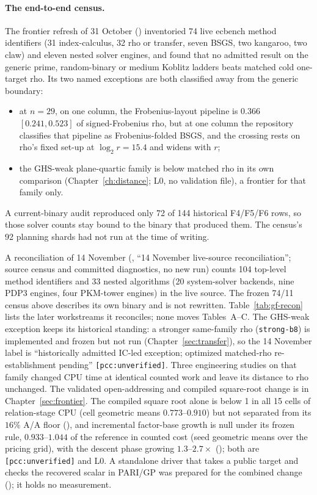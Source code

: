 \paragraph{The end-to-end census.} The frontier refresh of 31 October
() inventoried 74 live ecbench
method identifiers (31 index-calculus, 32 rho or transfer, seven BSGS, two
kangaroo, two claw) and eleven nested solver engines, and found that no
admitted result on the generic prime, random-binary or medium Koblitz
ladders beats matched cold one-target rho. Its two named exceptions are
both classified away from the generic boundary:
\begin{itemize}
\item at $n=29$, on one column, the Frobenius-layout pipeline is $0.366$
  $[0.241,0.523]$ of signed-Frobenius rho, but at one column the repository
  classifies that pipeline as Frobenius-folded BSGS, and the crossing rests
  on rho's fixed set-up at $\log_2r=15.4$ and widens with $r$;
\item the GHS-weak plane-quartic family is below matched rho in its own
  comparison (Chapter~\ref{ch:distance}; L0, no validation file), a
  frontier for that family only.
\end{itemize}
A current-binary audit reproduced only 72 of 144 historical F4/F5/F6 rows,
so those solver counts stay bound to the binary that produced them. The
census's 92 planning shards had not run at the time of writing.

A reconciliation of 14 November
(, ``14 November
live-source reconciliation''; source census and committed diagnostics, no new
run) counts 104 top-level method identifiers and 33 nested algorithms (20
system-solver backends, nine PDP3 engines, four PKM-tower engines) in the
live source. The frozen 74/11 census above describes its own binary and is
not rewritten. Table~\ref{tab:gf-recon} lists the later workstreams it
reconciles; none moves Tables~A--C. The GHS-weak exception keeps its
historical standing: a stronger same-family rho (\texttt{strong-b8}) is
implemented and frozen but not run (Chapter~\ref{sec:transfer}), so the
14 November label is ``historically admitted IC-led exception; optimized
matched-rho re-establishment pending'' \texttt{[pcc:unverified]}. Three
engineering studies on that family changed CPU time at identical counted
work and leave its distance to rho unchanged. The validated open-addressing
and compiled square-root change is in Chapter~\ref{sec:frontier}. The
compiled square root alone is below 1 in all 15 cells of relation-stage CPU
(cell geometric means $0.773$--$0.910$) but not separated from its $16\%$
A/A floor (), and
incremental factor-base growth is null under its frozen rule, $0.933$--$1.044$
of the reference in counted cost (seed geometric means over the pricing
grid), with the descent phase growing
$1.3$--$2.7\times$ (); both
are \texttt{[pcc:unverified]} and L0. A standalone driver that takes a
public target and checks the recovered scalar in PARI/GP was prepared for
the combined change (); it
holds no measurement.

